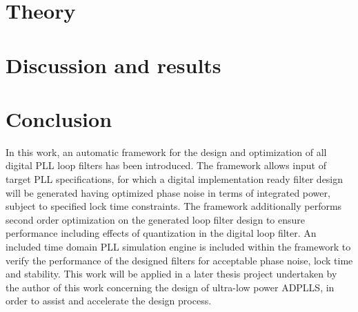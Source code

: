 	\section{Theory}\label{theory}
	
	

	\pagebreak
	

    \pagebreak
	\section{Discussion and results}\label{disco}
    

    \FloatBarrier

    \pagebreak
    \section{Conclusion} \label{conclusion}
    In this work, an automatic framework for the design and optimization of all digital PLL loop filters has been introduced. The framework allows input of target PLL specifications, for which a digital implementation ready filter design will be generated having optimized phase noise in terms of integrated power, subject to specified lock time constraints. The framework additionally performs second order optimization on the generated loop filter design to ensure performance including effects of quantization in the digital loop filter. An included time domain PLL simulation engine is included within the framework to verify the performance of the designed filters for acceptable phase noise, lock time and stability. This work will be applied in a later thesis project undertaken by the author of this work concerning the design of ultra-low power ADPLLS, in order to assist and accelerate the design process. 


    \pagebreak
	\printbibliography


	\pagebreak
	


